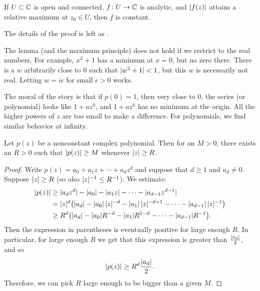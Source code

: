 \begin{thm}%
%
\label{thm:maxprinciple}
If $U \subset {\mathbb{C}}$ is open and connected,
$f \colon U \to {\mathbb{C}}$ is analytic, and $\lvert {f(z)} \rvert$ attains a relative
maximum at $z_0 \in U$, then $f$ is constant.
\end{thm}

The details of the proof is left as .

\begin{remark}
The lemma (and the maximum principle) does not hold if we restrict to the real numbers.  For
example, $x^2+1$ has a minimum at $x=0$, but no zero there.
There is a $w$ arbitrarily close to $0$ such that $\lvert {w^2+1} \rvert < 1$, but this
$w$ is necessarily not real.  Letting $w = i\epsilon$ for small
$\epsilon > 0$ works.
\end{remark}

The moral of the story is that if $p(0) = 1$, then very close to 0, the
series (or polynomial)
looks like $1+az^k$, and $1+az^k$ has no minimum at the origin.  All the higher
powers of $z$ are too small to make a difference.  For polynomials, we find similar behavior
at infinity.

\begin{lemma}
Let $p(z)$ be a nonconstant complex polynomial.  Then for an $M > 0$, there exists
an $R > 0$ such that
$\lvert {p(z)} \rvert \geq M$ whenever $\lvert {z} \rvert \geq R$.
\end{lemma}

\begin{proof}
Write $p(z) = a_0 + a_1 z + \cdots + a_d z^d$ and suppose that $d \geq 1$
and $a_d \not= 0$.
Suppose $\lvert {z} \rvert \geq R$ (so also $\lvert {z} \rvert^{-1} \leq R^{-1}$).
We estimate:
\begin{equation*}
\begin{split}
\lvert {p(z)} \rvert
& \geq
\lvert {a_d z^d} \rvert -
\lvert {a_0} \rvert - \lvert {a_1 z} \rvert - \cdots - \lvert {a_{d-1} z^{d-1} } \rvert
\\
& =
\lvert {z} \rvert^d \bigl(
\lvert {a_d} \rvert -
\lvert {a_0} \rvert \, \lvert {z} \rvert^{-d} -
\lvert {a_1} \rvert \, \lvert {z} \rvert^{-d+1} - \cdots - \lvert {a_{d-1}} \rvert \, \lvert {z} \rvert^{-1}
\bigr)
\\
& \geq
R^d \bigl(\lvert {a_d} \rvert -
\lvert {a_0} \rvert R^{-d} - \lvert {a_1} \rvert R^{1-d} - \cdots - \lvert {a_{d-1}} \rvert R^{-1} \bigr)
.
\end{split}
\end{equation*}
Then the expression in parentheses is eventually positive for large enough
$R$.  In particular, for large enough $R$ we get that this expression
is greater than
$\frac{\lvert {a_d} \rvert}{2}$, and so
\begin{equation*}
\lvert {p(z)} \rvert
\geq
R^d \frac{\lvert {a_d} \rvert}{2} .
\end{equation*}
Therefore,
we can pick $R$ large enough to be bigger than a given $M$.
\end{proof}

